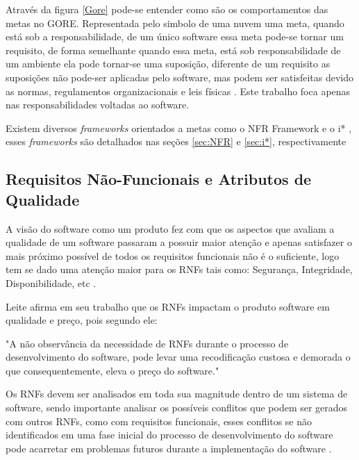  Através da figura \ref{Gore} pode-se entender como são os comportamentos das metas no GORE. Representada pelo simbolo de uma nuvem uma meta, quando está sob a responsabilidade, de um único software essa meta pode-se tornar um requisito, de forma semelhante quando essa meta, está sob responsabilidade de um ambiente ela pode tornar-se uma suposição, diferente de um requisito as suposições não pode-ser aplicadas pelo software, mas podem ser satisfeitas devido as normas, regulamentos organizacionais e leis físicas \cite{van2001goal}. Este trabalho foca apenas nas responsabilidades voltadas ao software.


Existem diversos \textit{frameworks} orientados a metas como o NFR Framework \cite{chung2012non} e o i* \cite{istarwiki20}, esses \textit{frameworks} são detalhados nas seções \ref{sec:NFR} e \ref{sec:i*}, respectivamente

\subsection{Requisitos Não-Funcionais e Atributos de Qualidade}
\label{subsec:requisitosNaoFuncionais}

A visão do software como um produto fez com que os aspectos que avaliam a qualidade de um software passaram a possuir maior atenção e apenas satisfazer o mais próximo possível de todos os requisitos funcionais não é o suficiente, logo tem se dado uma atenção maior para os RNFs tais como: Segurança, Integridade, Disponibilidade, etc \cite{cysneiros1997definindo}.


Leite afirma em seu trabalho que os RNFs impactam o produto software em qualidade e preço, pois segundo ele:

\begin{citacao}
	"A não observância da necessidade de RNFs durante o processo de desenvolvimento do software, pode levar uma recodificação custosa e demorada o que consequentemente, eleva o preço do software." \cite[p. 2]{cysneiros1997definindo}
\end{citacao}

Os RNFs devem ser analisados em toda sua magnitude dentro de um sistema de software, sendo importante analisar os possíveis conflitos que podem ser gerados com outros RNFs, como com requisitos funcionais, esses conflitos se não identificados em uma fase inicial do processo de desenvolvimento do software pode acarretar em problemas futuros durante a implementação do software \cite{cysneiros1997definindo}. 


